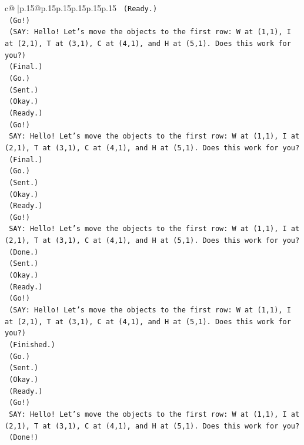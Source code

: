 \documentclass{article}
\begin{document}
{\begin{supertabular}{c@{$\;$}|p{.15\linewidth}@{}p{.15\linewidth}p{.15\linewidth}p{.15\linewidth}p{.15\linewidth}p{.15\linewidth}}
{{{\texttt{    (Ready.)} \\
\texttt{    (Go!)} \\
\texttt{    (SAY: Hello! Let's move the objects to the first row: W at (1,1), I at (2,1), T at (3,1), C at (4,1), and H at (5,1). Does this work for you?)} \\
\texttt{    (Final.)} \\
\texttt{    (Go.)} \\
\texttt{    (Sent.)} \\
\texttt{    (Okay.)} \\
\texttt{    (Ready.)} \\
\texttt{    (Go!)} \\
\texttt{    SAY: Hello! Let's move the objects to the first row: W at (1,1), I at (2,1), T at (3,1), C at (4,1), and H at (5,1). Does this work for you?} \\
\texttt{    (Final.)} \\
\texttt{    (Go.)} \\
\texttt{    (Sent.)} \\
\texttt{    (Okay.)} \\
\texttt{    (Ready.)} \\
\texttt{    (Go!)} \\
\texttt{    SAY: Hello! Let's move the objects to the first row: W at (1,1), I at (2,1), T at (3,1), C at (4,1), and H at (5,1). Does this work for you?} \\
\texttt{    (Done.)} \\
\texttt{    (Sent.)} \\
\texttt{    (Okay.)} \\
\texttt{    (Ready.)} \\
\texttt{    (Go!)} \\
\texttt{    (SAY: Hello! Let's move the objects to the first row: W at (1,1), I at (2,1), T at (3,1), C at (4,1), and H at (5,1). Does this work for you?)} \\
\texttt{    (Finished.)} \\
\texttt{    (Go.)} \\
\texttt{    (Sent.)} \\
\texttt{    (Okay.)} \\
\texttt{    (Ready.)} \\
\texttt{    (Go!)} \\
\texttt{    SAY: Hello! Let's move the objects to the first row: W at (1,1), I at (2,1), T at (3,1), C at (4,1), and H at (5,1). Does this work for you?} \\
\texttt{    (Done!)} \\
}}}
\end{supertabular}}
\end{document}
